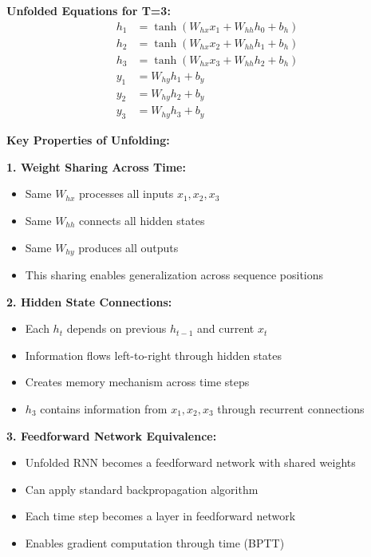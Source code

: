 \documentclass[12pt]{article}
\begin{document}
\begin{enumerate}[(a)]
{    \textbf{Unfolded Equations for T=3:}
    \begin{align}
    h_1 &= \tanh(W_{hx} x_1 + W_{hh} h_0 + b_h) \\
    h_2 &= \tanh(W_{hx} x_2 + W_{hh} h_1 + b_h) \\
    h_3 &= \tanh(W_{hx} x_3 + W_{hh} h_2 + b_h) \\
    y_1 &= W_{hy} h_1 + b_y \\
    y_2 &= W_{hy} h_2 + b_y \\
    y_3 &= W_{hy} h_3 + b_y
    \end{align}
    
    \textbf{Key Properties of Unfolding:}
    
    \textbf{1. Weight Sharing Across Time:}
    \begin{itemize}
        \item Same $W_{hx}$ processes all inputs $x_1, x_2, x_3$
        \item Same $W_{hh}$ connects all hidden states
        \item Same $W_{hy}$ produces all outputs
        \item This sharing enables generalization across sequence positions
    \end{itemize}
    
    \textbf{2. Hidden State Connections:}
    \begin{itemize}
        \item Each $h_t$ depends on previous $h_{t-1}$ and current $x_t$
        \item Information flows left-to-right through hidden states
        \item Creates memory mechanism across time steps
        \item $h_3$ contains information from $x_1, x_2, x_3$ through recurrent connections
    \end{itemize}
    
    \textbf{3. Feedforward Network Equivalence:}
    \begin{itemize}
        \item Unfolded RNN becomes a feedforward network with shared weights
        \item Can apply standard backpropagation algorithm
        \item Each time step becomes a layer in feedforward network
        \item Enables gradient computation through time (BPTT)
    \end{itemize}
    
}
\end{enumerate}
\end{document}
